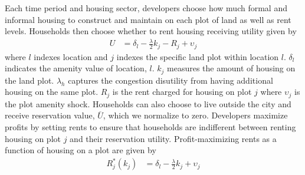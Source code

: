 \documentclass[12pt]{article}
\begin{document}



Each time period and housing sector, developers choose how much formal and informal housing to construct and maintain on each plot of land as well as rent levels.  Households then choose whether to rent housing receiving utility given by
\begin{align*}
U &= \delta_{l} - \frac{\lambda}{2} k_{j} - R_{j}   + \upsilon_{j}  
\end{align*}
\noindent where $l$ indexes location and $j$ indexes the specific land plot within location $l$.  $\delta_{l}$ indicates the amenity value of location, $l$.  $k_{j}$ measures the amount of housing on the land plot.  $\lambda_{h}$ captures the congestion disutility from having additional housing on the same plot.   $R_{j}$ is the rent charged for housing on plot $j$ where $\upsilon_{j}$ is the plot amenity shock.    Households can also choose to live outside the city and receive reservation value, $\overline{U}$, which we normalize to zero.  Developers maximize profits by setting rents to ensure that households are indifferent between renting housing on plot $j$ and their reservation utility. Profit-maximizing rents as a function of housing on a plot are given by
\begin{align*}
R_{j}^{*}(k_{j}) &= \delta_{l} - \frac{\lambda}{2} k_{j} + \upsilon_{j}
\end{align*}
\end{document}
